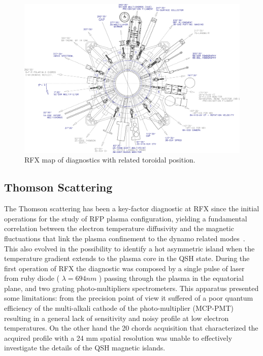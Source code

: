 %
\begin{figure}[ht!]
\includegraphics[width=1\textwidth]{img/rfx/Layout_Diagnosiche_AA10005.eps} \centering
\caption{RFX map of diagnostics with related toroidal position.}
\label{rfx}
\end{figure}
%

\subsection{Thomson Scattering}
The Thomson scattering  has been a key-factor diagnostic at RFX since the initial operations for the study of RFP plasma configuration, yielding a fundamental correlation between the electron temperature diffusivity and the magnetic fluctuations that link the plasma confinement to the dynamo related modes~\cite{}. This also evolved in the possibility to identify a hot asymmetric island when the temperature gradient extends to the plasma core in the \ac{QSH} state.
During the first operation of RFX the diagnostic was composed by a single pulse of laser from ruby diode ( $\lambda = 694 nm$ ) passing through the plasma in the equatorial plane, and two grating photo-multipliers spectrometers.
This apparatus presented some limitations: from the precision point of view it suffered of a poor quantum efficiency of the multi-alkali cathode of the photo-multiplier (MCP-PMT) resulting in a general lack of sensitivity and noisy profile at low electron temperatures. On the other hand the 20 chords acquisition that characterized the acquired profile with a 24 mm spatial resolution was unable to effectively investigate the details of the QSH magnetic islands.


